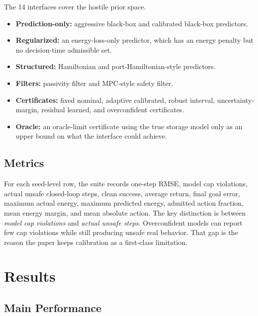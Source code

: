 \documentclass{article}
\begin{document}
The 14 interfaces cover the hostile prior space.
\begin{itemize}
    \item \textbf{Prediction-only:} aggressive black-box and calibrated black-box predictors.
    \item \textbf{Regularized:} an energy-loss-only predictor, which has an energy penalty but no decision-time admissible set.
    \item \textbf{Structured:} Hamiltonian and port-Hamiltonian-style predictors.
    \item \textbf{Filters:} passivity filter and MPC-style safety filter.
    \item \textbf{Certificates:} fixed nominal, adaptive calibrated, robust interval, uncertainty-margin, residual learned, and overconfident certificates.
    \item \textbf{Oracle:} an oracle-limit certificate using the true storage model only as an upper bound on what the interface could achieve.
\end{itemize}

\subsection{Metrics}

For each seed-level row, the suite records one-step RMSE, model cap violations, actual unsafe closed-loop steps, clean success, average return, final goal error, maximum actual energy, maximum predicted energy, admitted action fraction, mean energy margin, and mean absolute action. The key distinction is between \emph{model cap violations} and \emph{actual unsafe steps}. Overconfident models can report few cap violations while still producing unsafe real behavior. That gap is the reason the paper keeps calibration as a first-class limitation.

\section{Results}

\subsection{Main Performance}

\begin{table}[t]
\centering
\small
\caption{Main full-scale results across 10 families, 12 regimes, 14 methods, and 96 seeds per cell. Lower unsafe steps are better; higher clean success and return are better.}
\label{tab:main-performance}
\end{table}
\end{document}
